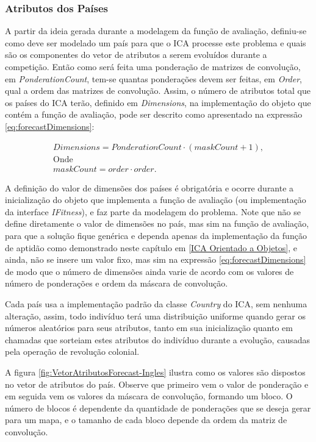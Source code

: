 \subsubsection{Atributos dos Países}
\label{Atributos dos Países}

A partir da ideia gerada durante a modelagem da função de avaliação, definiu-se como deve ser modelado um país para que o ICA processe este problema e quais são os componentes do vetor de atributos a serem evoluídos durante a competição. Então como será feita uma ponderação de matrizes de convolução, em \emph{PonderationCount}, tem-se quantas ponderações devem ser feitas, em \emph{Order}, qual a ordem das matrizes de convolução. Assim, o número de atributos total que os países do ICA terão, definido em \emph{Dimensions}, na implementação do objeto que contém a função de avaliação, pode ser descrito como apresentado na expressão \ref{eq:forecastDimensions}: 
	
\begin{equation}
\label{eq:forecastDimensions}
\begin{split}
Dimensions = PonderationCount \cdot (maskCount + 1), 
\\\text{Onde}
\\maskCount = order \cdot order.
\end{split}
\end{equation}

A definição do valor de dimensões dos países é obrigatória e ocorre durante a inicialização do objeto que implementa a função de  avaliação (ou implementação da interface \emph{IFitness}), e faz parte da modelagem do problema. Note que não se define diretamente o valor de dimensões no país, mas sim na função de avaliação, para  que a solução fique genérica e dependa apenas da implementação da função de aptidão como demonstrado neste capítulo em \ref{ICA Orientado a Objetos}, e ainda, não se insere um valor fixo, mas sim na expressão \ref{eq:forecastDimensions} de modo que o número de dimensões ainda varie de acordo com os valores de número de ponderações e ordem da máscara de convolução.

	Cada país usa a implementação padrão da classe \emph{Country} do ICA, sem nenhuma alteração, assim, todo indivíduo terá uma distribuição uniforme quando gerar os números aleatórios para seus atributos, tanto em sua inicialização quanto em chamadas que sorteiam estes atributos do indivíduo durante a evolução, causadas pela operação de revolução colonial.

	A figura \ref{fig:VetorAtributosForecast-Ingles} ilustra como os valores são dispostos no vetor de atributos do país. Observe que primeiro vem o valor de ponderação e em seguida vem os valores da máscara de convolução, formando um bloco. O número de blocos é dependente da quantidade de ponderações que se deseja gerar para um mapa, e o tamanho de cada bloco depende da ordem da matriz de convolução.

